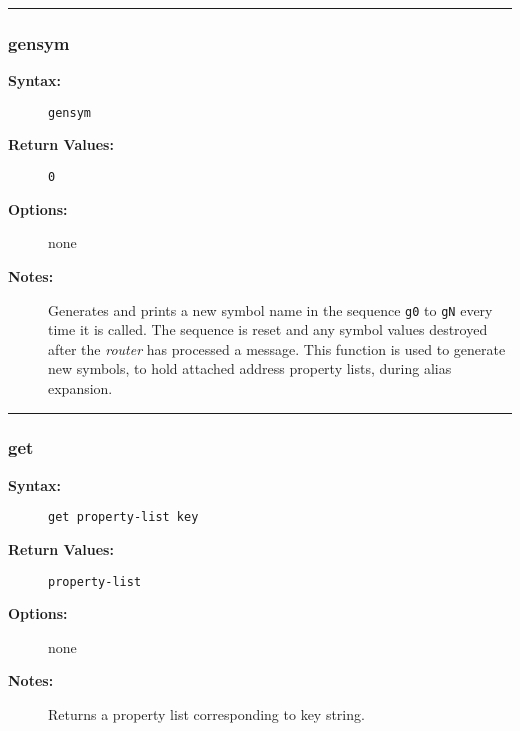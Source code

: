 \hrule
\subsubsection{gensym}

\begin{description}
\item[{\bf Syntax:}] \mbox{}

{\tt gensym}

\item[{\bf Return Values:}] \mbox{}

\begin{description}
\item[{\tt 0}] \mbox{}



\end{description}


\item[{\bf Options:}] \mbox{}

none  

\item[{\bf Notes:}] \mbox{}

Generates and prints a new symbol name in the 
sequence {\tt g0} to {\tt gN} every time it is called. The 
sequence is reset and any symbol values destroyed after the {\em router\/} 
has processed a message. This function is used to generate new symbols, to 
hold attached address property lists, during alias expansion.

\end{description}


\hrule
\subsubsection{get}

\begin{description}
\item[{\bf Syntax:}] \mbox{}

{\tt get property-list key}

\item[{\bf Return Values:}] \mbox{}

{\tt property-list}

\item[{\bf Options:}] \mbox{}

none  

\item[{\bf Notes:}] \mbox{}

Returns a property list corresponding to key string.

\end{description}


